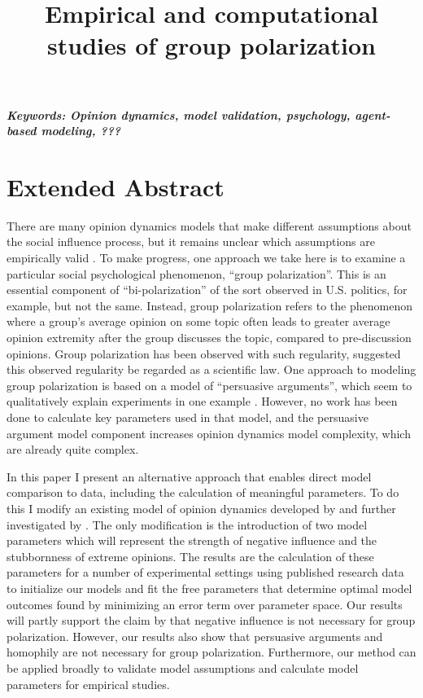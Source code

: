 \documentclass[a4paper,12pt]{article}
\title{Empirical and computational studies of group polarization}
\author[]{} %
\date{}
\begin{document}
\maketitle
\thispagestyle{fancy}

\vspace{-6em}
\begin{center}
\textbf{\textit{Keywords: Opinion dynamics, model validation, psychology, agent-based modeling, ???}}
\newline
\end{center}

\section*{Extended Abstract}

There are many opinion dynamics models that make different assumptions about
the social influence process, but it remains unclear which assumptions are
empirically valid \cite{Flache2017}. To make progress, one approach we take
here is to examine a particular social psychological phenomenon, ``group
polarization''. This is an essential component of ``bi-polarization'' of the
sort observed in U.S. politics, for example, but not the same. Instead, group
polarization refers to the phenomenon where a group's average opinion on 
some topic often leads to greater average opinion extremity 
after the group discusses the topic, compared to pre-discussion opinions.
Group polarization has been observed with such regularity, 
 suggested this
observed regularity be regarded as a scientific law. One approach to 
modeling group polarization is based on a model of ``persuasive arguments'', 
which seem to qualitatively explain experiments in one example \cite{Mas2013}.
However, no work has been done to calculate key parameters used in that model,
and the persuasive argument model component increases opinion dynamics model
complexity, which are already quite complex.

In this paper I present an alternative approach that enables direct 
model comparison to data, including the calculation of meaningful parameters.
To do this I modify an existing model of opinion dynamics developed by
 and further investigated by . The only
modification is the introduction of two model parameters which will represent
the strength of negative influence and the stubbornness of extreme opinions.
The results are the calculation of these parameters for a number of 
experimental settings using published research data to initialize our models
and fit the free parameters that determine optimal model outcomes found by
minimizing an error term over parameter space. Our results will partly 
support the claim by  that negative influence is not necessary
for group polarization. However, our results also show that persuasive arguments
and homophily are not necessary for group polarization. 
Furthermore, our method can be applied broadly to validate model assumptions 
and calculate model parameters for empirical studies.
\end{document}
